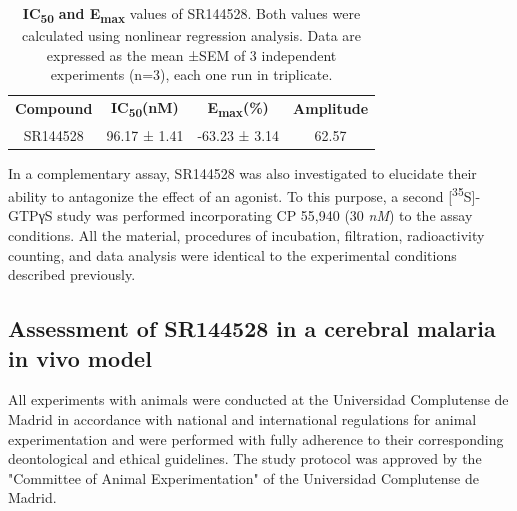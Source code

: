 \documentclass[empirical, authordate]{jote-new-article}
\begin{document}
\begin{table}
  \begin{fullwidth}
    \caption{\textbf{IC}\textsubscript{\textbf{50}}\textbf{ and E}\textsubscript{\textbf{max}}\textsubscript{ }values of SR144528. Both values were calculated using nonlinear regression analysis. Data are expressed as the mean ±SEM of 3 independent experiments (n=3), each one run in triplicate.}
    \label{tab:2}
    \begin{tabular}{c  c  c  c}
      \textbf{Compound } & \textbf{IC\textsubscript{50}(nM)} & \textbf{E\textsubscript{max}(\%) } & \textbf{Amplitude } \\
      SR144528           & 96.17 ± 1.41                      & -63.23 ± 3.14                      & 62.57               \\
    \end{tabular}
  \end{fullwidth}
\end{table}


In a complementary assay, SR144528 was also investigated to elucidate their ability to antagonize the effect of an agonist. To this purpose, a second [\textsuperscript{35}S]-GTPγS study was performed incorporating CP 55,940 (30 \emph{nM}) to the assay conditions. All the material, procedures of incubation, filtration, radioactivity counting, and data analysis were identical to the experimental conditions described previously.

\subsection{Assessment of SR144528 in a cerebral malaria in vivo model}

All experiments with animals were conducted at the Universidad Complutense de Madrid in accordance with national and international regulations for animal experimentation and were performed with fully adherence to their corresponding deontological and ethical guidelines. The study protocol was approved by the "Committee of Animal Experimentation" of the Universidad Complutense de Madrid.
\end{document}
